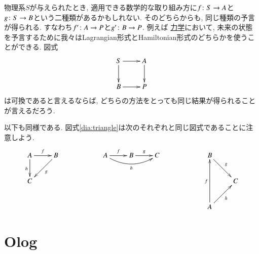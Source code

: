 \begin{application}


物理系$S$が与えられたとき, 適用できる数学的な取り組み方に$f\colon S\rightarrow A$と$g\colon S\rightarrow B$という二種類があるかもしれない. そのどちらからも, 同じ種類の予言が得られる. すなわち$f'\colon A\rightarrow P$と$g'\colon B\rightarrow P$. 例えば
\href{http://en.wikipedia.org/wiki/Hamiltonian_mechanics#As_a_reformulation_of_Lagrangian_mechanics}{力学}において, 未来の状態を予言するために我々はLagrangian形式とHamiltonian形式のどちらかを使うことができる. 図式
$$
\xymatrix{S\ar[r]\ar[d]&A\ar[d]\\B\ar[r]&P}
$$
は可換であると言えるならば, どちらの方法をとっても同じ結果が得られることが言えるだろう.

\end{application}


以下も同様である. 図式\eqref{dia:triangle}は次のそれぞれと同じ図式であることに注意しよう.
$$
\xymatrix{A\ar[r]^f\ar[d]_h&B\ar[dl]^g\\C}\hspace{.8in}
\xymatrix{A\ar[r]^f\ar@/_1pc/[rr]_h&B\ar[r]^g&C}\hspace{.8in}
\xymatrix{B\ar[rd]^g\\&C\\A\ar[ru]_h\ar[uu]^f}$$


\section{Olog}\label{sec:ologs}

